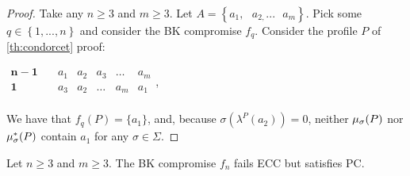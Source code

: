 \documentclass[version=3.21, pagesize, twoside=off, bibliography=totoc, DIV=calc, fontsize=12pt, a4paper]{scrartcl}
\begin{document}
\begin{proof}
Take any $n\geq 3$ and $m\geq 3.$ Let $A=\left\{ a_{1},\text{ }a_{2,}...%
\text{ }a_{m}\right\} $. Pick some $q\in \left\{ 1,...,n\right\} $ and
consider the BK compromise $f_{q}$. Consider the profile $P$ of \cref{th:condorcet} proof:
\begin{center}
	$
	\begin{array}{cccccc}
	\mathbf{n-1} \quad &a_1&a_2&a_3&\dots&a_m\\
	\mathbf{1} \quad &a_3&a_2&\dots&a_m&a_1\\
	\end{array}
	$,
\end{center}
We have that $f_{q}(P)=\{a_1\}$, and, because $\sigma(\lambda^P(a_2)) = 0$, neither $\mu_{\sigma}(P)$ nor $\mu_{\sigma}^*(P)$ contain $a_1$ for any $\sigma \in \Sigma$. 
\end{proof}

\begin{theorem}
	\label{th:FBn3}
Let $n\geq 3$ and $m\geq 3.$ The BK compromise $f_{n}$ fails ECC but satisfies PC.
\end{theorem}
\end{document}
